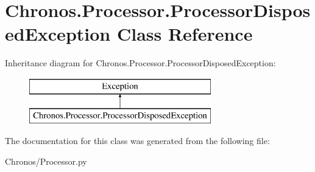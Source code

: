 \hypertarget{classChronos_1_1Processor_1_1ProcessorDisposedException}{}\section{Chronos.\+Processor.\+Processor\+Disposed\+Exception Class Reference}
\label{classChronos_1_1Processor_1_1ProcessorDisposedException}
Inheritance diagram for Chronos.\+Processor.\+Processor\+Disposed\+Exception\+:\begin{figure}[H]
\begin{center}
\leavevmode
\includegraphics[height=2.000000cm]{classChronos_1_1Processor_1_1ProcessorDisposedException}
\end{center}
\end{figure}


The documentation for this class was generated from the following file\+:\begin{DoxyCompactItemize}
\item 
Chronos/Processor.\+py\end{DoxyCompactItemize}
